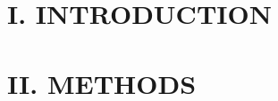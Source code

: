 \begin{multicols}{2}
	
	
		
%	
	
	\section*{I. INTRODUCTION}%
	
	
	
	
	
	\section*{II. METHODS}%


	
	
	
	
	
	
	
	
	
	
	
	
	
	
	
	
	
	
	
	

\end{multicols}
